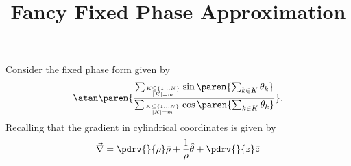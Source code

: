 \documentclass[onecolumn,amsmath,amssymb,nofootinbib,floatfix]{revtex4}
\title{Fancy Fixed Phase Approximation}
\begin{document}
Consider the fixed phase form given by
$$\atan\paren{\frac{\sum_{K\subseteq \{1\dots N\}\atop |K|=m} \sin\paren{\sum_{k\in K} \theta_k}}{\sum_{K\subseteq \{1\dots N\}\atop |K|=m} \cos\paren{\sum_{k\in K} \theta_k}}}.
$$
Recalling that the gradient in cylindrical coordinates is given by
$$
\vec{\nabla} = \pdrv{}{\rho}\hat{\rho} + \frac{1}{\rho}\hat{\theta} + \pdrv{}{z}\hat{z}
$$
\end{document}
